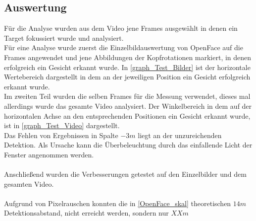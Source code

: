 \subsection{Auswertung}
Für die Analyse wurden aus dem Video jene Frames ausgewählt in denen ein Target fokussiert wurde und analysiert.\\
Für eine Analyse wurde zuerst die Einzelbildauswertung von OpenFace auf die Frames angewendet und jene Abbildungen der Kopfrotationen markiert, in denen erfolgreich ein Gesicht erkannt wurde. In \autoref{graph_Test_Bilder} ist der horizontale Wertebereich dargestellt in dem an der jeweiligen Position ein Gesicht erfolgreich erkannt wurde.\\
Im zweiten Teil wurden die selben Frames für die Messung verwendet, dieses mal allerdings wurde das gesamte Video analysiert. Der Winkelbereich in dem auf der horizontalen Achse an den entsprechenden Positionen ein Gesicht erkannt wurde, ist in \autoref{graph_Test_Video} dargestellt.\\
Das Fehlen von Ergebnissen in Spalte $-3m$ liegt an der unzureichenden Detektion. Als Ursache kann die Überbeleuchtung durch das einfallende Licht der Fenster angenommen werden.\\\\
Anschließend wurden die Verbesserungen getestet auf den Einzelbilder und dem gesamten Video.\\\\ 
Aufgrund von Pixelrauschen konnten die in \autoref{OpenFace_skal} theoretischen $14m$ Detektionsabstand, nicht erreicht werden, sondern nur $XXm$
